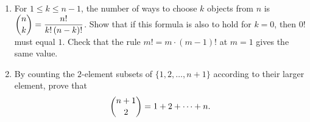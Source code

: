 \begin{enumerate}
\item[(a)] For $1\le k\le n-1$, the number of ways to choose $k$ objects from $n$ is $\dbinom nk=\dfrac{n!}{k!\,(n-k)!}$. Show that if this formula is also to hold for $k=0$, then $0!$ must equal $1$. Check that the rule $m!=m\cdot(m-1)!$ at $m=1$ gives the same value.
\item[(b)] By counting the $2$-element subsets of $\{1,2,\dots,n+1\}$ according to their larger element, prove that
\[\dbinom{n+1}{2}=1+2+\cdots+n.\]
\end{enumerate}
